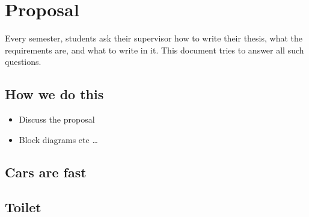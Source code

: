 \chapter{Proposal}\label{ch:proposal}

Every semester, students ask their supervisor how to write their thesis,
what the requirements are, and what to write in it.  
This document tries to answer all such questions.

\section{How we do this}

\begin{itemize}
  \item Discuss the proposal
  \item Block diagrams etc
\ldots
\end{itemize}

\section{Cars are fast}

\section{Toilet}

